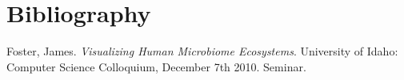 



\section{Bibliography}

\begin{thebibliography}{99}
 Foster, James. {\em Visualizing Human Microbiome
        Ecosystems}. University of Idaho: Computer Science Colloquium, 
        December 7th 2010. Seminar.
\end{thebibliography}
